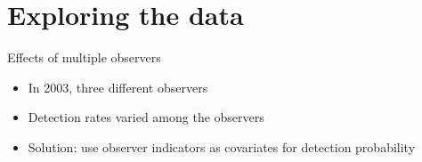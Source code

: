 \documentclass{beamer}
\begin{document}
\section{Exploring the data}
\begin{frame}{Effects of multiple observers}
	\begin{itemize}
		\item In 2003, three different observers
		\item Detection rates varied among the observers
	\end{itemize}
	\begin{center}
	\end{center}
	\begin{itemize}
		\item Solution: use observer indicators as covariates for detection
		probability
	\end{itemize}
\end{frame}
\end{document}
